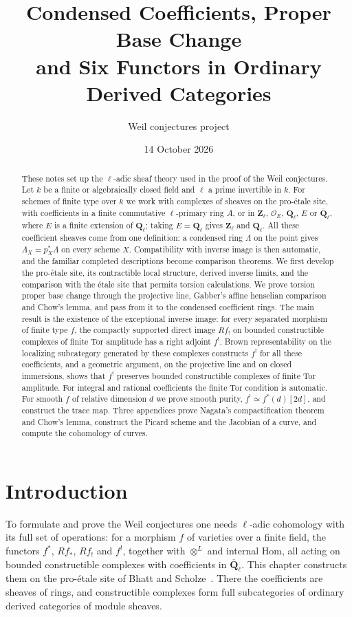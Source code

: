 \documentclass[11pt,a4paper]{article}
\title{Condensed Coefficients, Proper Base Change\\
and Six Functors in Ordinary Derived Categories}
\author{Weil conjectures project}
\date{14 October 2026}
\numberwithin{equation}{section}
\theoremstyle{definition}
\theoremstyle{remark}
\newcommand{\Qbar}{\overline{\mathbf Q}_\ell}
\newcommand{\Ql}{\mathbf Q_\ell}
\newcommand{\Zl}{\mathbf Z_\ell}
\begin{document}
\maketitle
\begin{abstract}
These notes set up the $\ell$-adic sheaf theory used in the proof of the
Weil conjectures. Let $k$ be a finite or algebraically closed field and
$\ell$ a prime invertible in $k$. For schemes of finite type over $k$ we
work with complexes of sheaves on the pro-\'etale site, with
coefficients in a finite commutative $\ell$-primary ring $A$, or in
$\Zl$, $\mathcal O_E$, $\Ql$, $E$ or $\overline{\mathbf Q}_\ell$, where
$E$ is a finite extension of $\mathbf Q_\ell$; taking $E=\Ql$ gives
$\Zl$ and $\Ql$. All these coefficient sheaves come from one
definition: a condensed ring $\Lambda$ on the point gives
$\Lambda_X=p_X^*\Lambda$ on every scheme $X$. Compatibility with
inverse image is then automatic, and the familiar completed descriptions
become comparison theorems. We first develop the pro-\'etale site,
its contractible local structure, derived inverse limits, and the
comparison with the \'etale site that permits torsion calculations.
We prove torsion proper base change through the projective line,
Gabber's affine henselian comparison and Chow's lemma, and pass from it
to the condensed coefficient rings. The main result is the existence of the
exceptional inverse image: for every separated morphism of finite type
$f$, the compactly supported direct image $Rf_!$ on bounded
constructible complexes of finite Tor amplitude has a right adjoint
$f^!$. Brown representability on the localizing
subcategory generated by these complexes constructs $f^!$ for all these
coefficients, and a geometric argument, on the projective line and on
closed immersions, shows that $f^!$ preserves bounded constructible
complexes of finite Tor amplitude. For integral and rational
coefficients the finite Tor condition is automatic. For smooth $f$ of relative dimension $d$ we prove smooth
purity, $f^!\simeq f^*(d)[2d]$, and construct the trace map.
Three appendices prove Nagata's compactification theorem and Chow's
lemma, construct the Picard scheme and the Jacobian of a curve, and
compute the cohomology of curves.
\end{abstract}
\tableofcontents

\section{Introduction}
\label{n:scope}
To formulate and prove the Weil conjectures one needs $\ell$-adic
cohomology with its full set of operations: for a morphism $f$ of
varieties over a finite field, the functors $f^*$, $Rf_*$, $Rf_!$ and
$f^!$, together with $\otimes^L$ and internal Hom, all acting on bounded
constructible complexes with coefficients in $\Qbar$. This chapter
constructs them on the pro-\'etale site of Bhatt and
Scholze~\cite{BS}. There the coefficients are sheaves of rings, and
constructible complexes form full subcategories of ordinary derived
categories of module sheaves.
\end{document}

